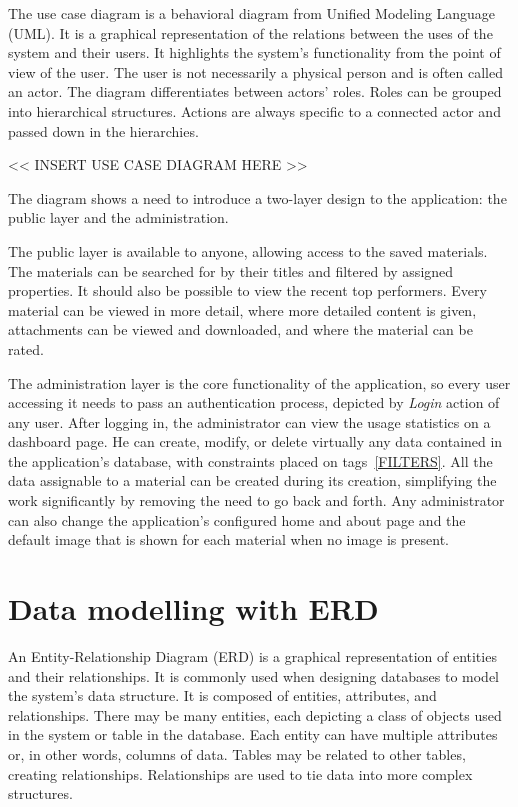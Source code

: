 \documentclass[
  digital,     %
  oneside,     %
  nosansbold,  %
  colorbold, %
  lof,         %
  lot,         %
]{fithesis4}
\begin{document}
The use case diagram is a behavioral diagram from Unified Modeling Language (UML). It is a graphical representation of the relations between the uses of the system and their users. It highlights the system's functionality from the point of view of the user. The user is not necessarily a physical person and is often called an actor. The diagram differentiates between actors' roles. Roles can be grouped into hierarchical structures. Actions are always specific to a connected actor and passed down in the hierarchies.

<< INSERT USE CASE DIAGRAM HERE >>

The diagram shows a need to introduce a two-layer design to the application: the public layer and the administration.

The public layer is available to anyone, allowing access to the saved materials. The materials can be searched for by their titles and filtered by assigned properties. It should also be possible to view the recent top performers. Every material can be viewed in more detail, where more detailed content is given, attachments can be viewed and downloaded, and where the material can be rated.

The administration layer is the core functionality of the application, so every user accessing it needs to pass an authentication process, depicted by \textit{Login} action of any user. After logging in, the administrator can view the usage statistics on a dashboard page. He can create, modify, or delete virtually any data contained in the application's database, with constraints placed on tags~\ref{FILTERS}. All the data assignable to a material can be created during its creation, simplifying the work significantly by removing the need to go back and forth. Any administrator can also change the application's configured home and about page and the default image that is shown for each material when no image is present.

\section{Data modelling with ERD}

An Entity-Relationship Diagram (ERD) is a graphical representation of entities and their relationships. It is commonly used when designing databases to model the system's data structure. It is composed of entities, attributes, and relationships. There may be many entities, each depicting a class of objects used in the system or table in the database. Each entity can have multiple attributes or, in other words, columns of data. Tables may be related to other tables, creating relationships. Relationships are used to tie data into more complex structures.
\end{document}
